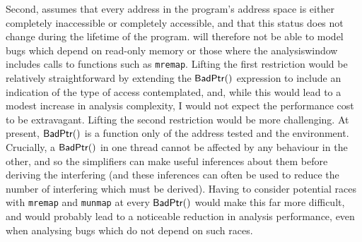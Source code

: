 Second, {\implementation} assumes that every address in the program's
address space is either completely inaccessible or completely
accessible, and that this status does not change during the lifetime
of the program.  {\Implementation} will therefore not be able to model
bugs which depend on read-only memory or those where the
\gls{analysiswindow} includes calls to functions such as
\texttt{mremap}.  Lifting the first restriction would be relatively
straightforward by extending the $\mathsf{BadPtr}()$ expression to include
an indication of the type of access contemplated, and, while this
would lead to a modest increase in analysis complexity, I would not
expect the performance cost to be extravagant.  Lifting the second
restriction would be more challenging.  At present, $\mathsf{BadPtr}()$ is a
function only of the address tested and the {\StateMachine}
environment.  Crucially, a $\mathsf{BadPtr}()$ in one thread cannot be
affected by any behaviour in the other, and so the {\StateMachine}
simplifiers can make useful inferences about them before deriving the
interfering {\StateMachine} (and these inferences can often be used to
reduce the number of interfering {\StateMachines} which must be
derived).  Having to consider potential races with \texttt{mremap} and
\texttt{munmap} at every $\mathsf{BadPtr}()$ would make this far more
difficult, and would probably lead to a noticeable reduction in
analysis performance, even when analysing bugs which do not depend on
such races.

